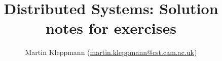 \documentclass{article}
\begin{document}
\title{Distributed Systems: Solution notes for exercises}
\author{Martin Kleppmann (\url{martin.kleppmann@cst.cam.ac.uk})}
\date{}
\maketitle


\end{document}
